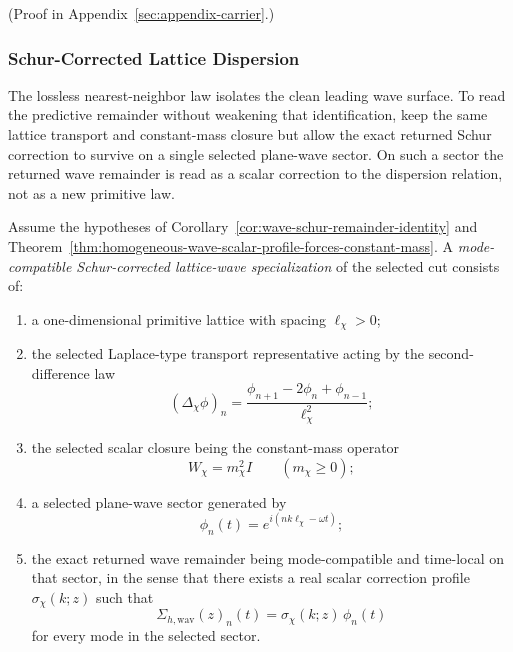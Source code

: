 (Proof in Appendix~\ref{sec:appendix-carrier}.)

\subsubsection{Schur-Corrected Lattice Dispersion}

The lossless nearest-neighbor law isolates the clean leading wave surface.
To read the predictive remainder without weakening that identification, keep
the same lattice transport and constant-mass closure but allow the exact
returned Schur correction to survive on a single selected plane-wave sector.
On such a sector the returned wave remainder is read as a scalar correction to
the dispersion relation, not as a new primitive law.

\begin{definition}
\label{def:mode-compatible-schur-corrected-lattice-wave-specialization}
Assume the hypotheses of
Corollary~\ref{cor:wave-schur-remainder-identity} and
Theorem~\ref{thm:homogeneous-wave-scalar-profile-forces-constant-mass}. A
\emph{mode-compatible Schur-corrected lattice-wave specialization} of the
selected cut consists of:
\begin{enumerate}[label=(\roman*),itemsep=0.2em]
\item a one-dimensional primitive lattice with spacing \(\ell_{\chi}>0\);
\item the selected Laplace-type transport representative acting by the
      second-difference law
      \[
      (\Delta_{\chi}\phi)_n
      =
      \frac{\phi_{n+1}-2\phi_n+\phi_{n-1}}{\ell_{\chi}^2};
      \]
\item the selected scalar closure being the constant-mass operator
      \[
      W_{\chi}=m_{\chi}^2 I
      \qquad (m_{\chi}\ge 0);
      \]
\item a selected plane-wave sector generated by
      \[
      \phi_n(t)=e^{i(nk\ell_{\chi}-\omega t)};
      \]
\item the exact returned wave remainder being mode-compatible and time-local on
      that sector, in the sense that there exists a real scalar correction
      profile \(\sigma_{\chi}(k;z)\) such that
      \[
      \Sigma_{h,\mathrm{wav}}(z)_n(t)
      =
      \sigma_{\chi}(k;z)\,\phi_n(t)
      \]
      for every mode in the selected sector.
\end{enumerate}
\end{definition}

